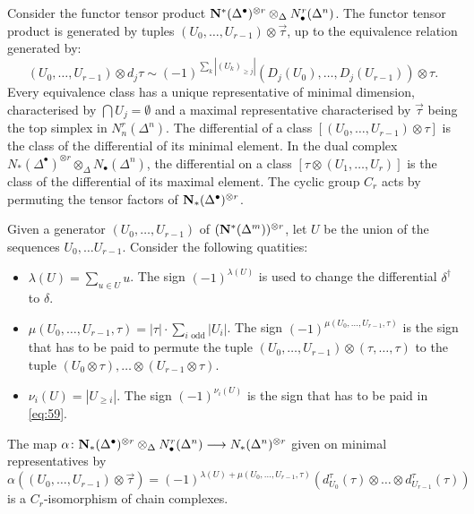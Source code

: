 Consider the functor tensor product $\mathbf{N}^*(\Delta^\bullet)^{\otimes r}\otimes_{\Delta} N_\bullet^r(\Delta^n)$. %
 The functor tensor product is generated by tuples $ (U_0,\ldots,U_{r-1})\otimes \vec{\tau}$, up to the equivalence relation generated by:
\begin{equation}\label{eq:59}(U_0,\ldots,U_{r-1})\otimes d_j\tau\sim (-1)^{\sum_k |(U_k)_{\geq j}|} (D_j(U_0),\ldots,D_j(U_{r-1}))\otimes \tau.
\end{equation}
Every equivalence class has a unique representative of minimal dimension, characterised by $\bigcap U_j = \emptyset$ and a maximal representative characterised by $\vec{\tau}$ being the top simplex in $N_n^r(\Delta^n)$. The differential of a class $[(U_0,\ldots,U_{r-1})\otimes \tau]$ is the class of the differential of its minimal element. In the dual complex $N_*(\Delta^\bullet)^{\otimes r}\otimes_\Delta N_\bullet(\Delta^n)$, the differential on a class $[\tau\otimes (U_1,\ldots,U_r)]$ is the class of the differential of its maximal element. The cyclic group $C_r$ acts by permuting the tensor factors of $\mathbf{N}_*(\Delta^\bullet)^{\otimes r}$.
\begin{definition} Given a generator $(U_0,\ldots,U_{r-1})$ of $(\mathbf{N}^*(\Delta^m))^{\otimes r}$, let $U$ be the union of the sequences $U_0,\ldots U_{r-1}$. Consider the following quatities:
\begin{itemize}
    \item $\lambda(U) = \sum_{u\in U} u$. The sign $(-1)^{\lambda(U)}$ is used to change the differential $\delta^\dagger$ to $\delta$.
    \item $\mu(U_0,\ldots,U_{r-1},\tau) = |\tau|\cdot \sum_{i\text{ odd}} |U_i|$. The sign $(-1)^{\mu(U_0,\ldots,U_{r-1},\tau)}$ is the sign that has to be paid to permute the tuple $(U_0,\ldots,U_{r-1})\otimes (\tau,\ldots,\tau)$ to the tuple $(U_0\otimes \tau), \ldots\otimes (U_{r-1}\otimes \tau)$.
    \item $\nu_i(U) = |U_{\geq i}|$. The sign $(-1)^{\nu_i(U)}$ is the sign that has to be paid in \eqref{eq:59}.
\end{itemize}
\end{definition}
\begin{lemma}
	The map $\alpha\colon \mathbf{N}_*(\Delta^\bullet)^{\otimes r}\otimes_{\Delta} N_\bullet^r(\Delta^n)\longrightarrow N_*(\Delta^n)^{\otimes r}$ given on minimal representatives by
	\[\alpha((U_0,\ldots,U_{r-1})\otimes \vec{\tau}) = (-1)^{\lambda(U)+ \mu(U_0,\ldots,U_{r-1},\tau)}(d_{U_0}^\tau(\tau)\otimes \ldots\otimes d_{U_{r-1}}^\tau(\tau))\]
	is a $C_r$-isomorphism of chain complexes.
\end{lemma}
